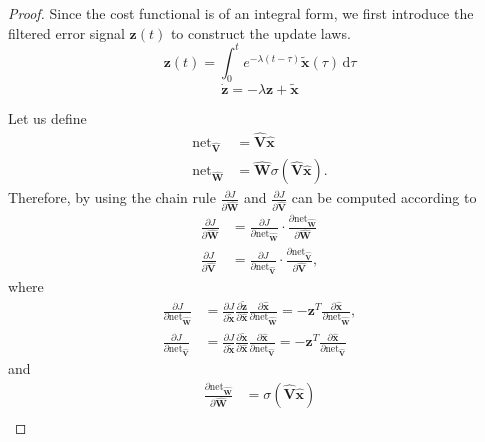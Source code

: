 \documentclass[11pt, a4paper]{article}
\newcommand{\ud}{\,\mathrm{d}}
\newcommand{\xtilde}{\tilde{\bm{x}}}
\begin{document}
\begin{proof}
 Since the cost functional is of an integral form, we first introduce the filtered error signal $\bm{z}(t)$ to construct the update laws.
\begin{equation}
    \bm{z}(t) = \int_{0}^{t} e^{-\lambda(t-\tau)} \xtilde(\tau) \ud\tau
    \label{eq:filter_z}
\end{equation}
\begin{equation}
    \dot{\bm{z}} = - \lambda\bm{z} + \xtilde
    \label{eq:filter_z_dot}
\end{equation}

Let us define
\begin{align}
    \text{net}_{\hat{\mathbf{V}}} &= \hat{\mathbf{V}}\hat{\bm{x}}  \\
    \text{net}_{\hat{\mathbf{W}}} &= \hat{\mathbf{W}}\sigma(\hat{\mathbf{V}}\hat{\bm{x}}).
\end{align}
Therefore, by using the chain rule $\frac{\partial J}{\partial \hat{\mathbf{W}}}$ and $\frac{\partial J}{\partial \hat{\mathbf{V}}}$ can be computed according to
\begin{align*}
    \frac{\partial J}{\partial \hat{\mathbf{W}}} &= \frac{\partial J}{\partial \text{net}_{\hat{\mathbf{W}}}} \cdot \frac{\partial \text{net}_{\hat{\mathbf{W}}}}{\partial \hat{\mathbf{W}}} \\
    \frac{\partial J}{\partial \hat{\mathbf{V}}} &= \frac{\partial J}{\partial \text{net}_{\hat{\mathbf{V}}}} \cdot \frac{\partial \text{net}_{\hat{\mathbf{V}}}}{\partial \hat{\mathbf{V}}},
\end{align*}
where
\begin{align}
    \frac{\partial J}{\partial \text{net}_{\hat{\mathbf{W}}}} 
    &= \frac{\partial J}{\partial \tilde{\bm{x}}} \frac{\partial \tilde{\bm{z}}}{\partial \hat{\bm{x}}} \frac{\partial \hat{\bm{x}}}{\partial \text{net}_{\hat{\mathbf{W}}}} = -{\bm{z}}^T \frac{\partial \hat{\bm{x}}}{\partial \text{net}_{\hat{\mathbf{W}}}}, \nonumber \\
    \frac{\partial J}{\partial \text{net}_{\hat{\mathbf{V}}}} 
    &= \frac{\partial J}{\partial \tilde{\bm{x}}} \frac{\partial \tilde{\bm{x}}}{\partial \hat{\bm{x}}} \frac{\partial \hat{\bm{x}}}{\partial \text{net}_{\hat{\mathbf{V}}}} = -{\bm{z}}^T \frac{\partial \hat{\bm{x}}}{\partial \text{net}_{\hat{\mathbf{V}}}}
\end{align}
and
\begin{align}
    \frac{\partial \text{net}_{\hat{\mathbf{W}}}}{\partial \hat{\mathbf{W}}} &= \sigma(\hat{\mathbf{V}}\hat{\bm{x}}) \nonumber \\

\end{align}
\end{proof}
\end{document}
